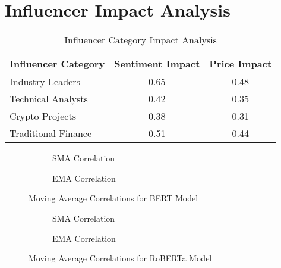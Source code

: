 \documentclass[12pt,a4paper]{report}
\begin{document}
\section{Influencer Impact Analysis}
\begin{table}[h]
    \centering
    \begin{tabular}{lcc}
        \toprule
        Influencer Category & Sentiment Impact & Price Impact \\
        \midrule
        Industry Leaders & 0.65 & 0.48 \\
        Technical Analysts & 0.42 & 0.35 \\
        Crypto Projects & 0.38 & 0.31 \\
        Traditional Finance & 0.51 & 0.44 \\
        \bottomrule
    \end{tabular}
    \caption{Influencer Category Impact Analysis}
\end{table}

\begin{figure}[H]
    \centering
    \begin{subfigure}[b]{0.48\textwidth}
        
        \caption{SMA Correlation}
    \end{subfigure}
    \hfill
    \begin{subfigure}[b]{0.48\textwidth}
        
        \caption{EMA Correlation}
    \end{subfigure}
    \caption{Moving Average Correlations for BERT Model}
\end{figure}

\begin{figure}[H]
    \centering
    \begin{subfigure}[b]{0.48\textwidth}
        
        \caption{SMA Correlation}
    \end{subfigure}
    \hfill
    \begin{subfigure}[b]{0.48\textwidth}
        
        \caption{EMA Correlation}
    \end{subfigure}
    \caption{Moving Average Correlations for RoBERTa Model}
\end{figure}
\end{document}
